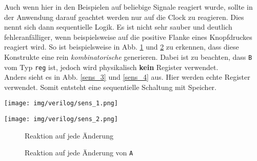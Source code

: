 Auch wenn hier in den Beispielen auf beliebige Signale reagiert wurde, sollte in der Anwendung darauf geachtet werden nur auf die Clock zu reagieren. Dies nennt sich dann sequentielle Logik. Es ist nicht sehr sauber und deutlich fehleranfälliger, wenn beispielsweise auf die positive Flanke eines Knopfdruckes reagiert wird. So ist beispielsweise in Abb. \ref{sens_1} und \ref{sens_2} zu erkennen, dass diese Konstrukte eine rein \emph{kombinatorische} generieren. Dabei ist zu beachten, dass \texttt{B} vom Typ \texttt{reg} ist, jedoch wird physikalisch \textbf{kein} Register verwendet.\\
Anders sieht es in Abb. \ref{sens_3} und \ref{sens_4} aus. Hier werden echte Register verwendet. Somit entsteht eine sequentielle Schaltung mit Speicher.

\begin{minipage}[H]{\textwidth}
	\begin{minipage}[H]{\textwidth}
		\begin{minipage}[b]{0.5\textwidth}
			\texttt{[image: img/verilog/sens\_1.png]}
		\end{minipage}
		\begin{minipage}[b]{0.5\textwidth}
			\texttt{[image: img/verilog/sens\_2.png]}
		\end{minipage}
	\end{minipage}
	\begin{minipage}[H]{\textwidth}
		\begin{minipage}[b]{0.5\textwidth}
			\centering
			\begin{minipage}[b]{0.9\textwidth}
				\begin{figure}[H]
					\lstset{style=verilog-style}
					
					\caption{Reaktion auf jede Änderung} \label{sens_1}
				\end{figure}
			\end{minipage}
		\end{minipage}	
		\begin{minipage}[b]{0.5\textwidth}
			\centering
			\begin{minipage}[b]{0.9\textwidth}
				\begin{figure}[H]
					\lstset{style=verilog-style}
					
					\caption{Reaktion auf jede Änderung von \texttt{A}} \label{sens_2}
				\end{figure}
			\end{minipage}

\end{minipage}
\end{minipage}
\end{minipage}
